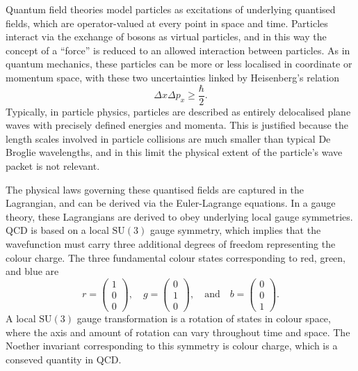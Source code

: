 \documentclass[12pt,a4paper]{report}
\begin{document}
Quantum field theories model particles as excitations of underlying quantised fields, which are operator-valued at every point in space and time. Particles interact via the exchange of bosons as virtual particles, and in this way the concept of a ``force'' is reduced to an allowed interaction between particles. As in quantum mechanics, these particles can be more or less localised in coordinate or momentum space, with these two uncertainties linked by Heisenberg's relation
\begin{equation}
  \Delta x \Delta p_x \geq \frac{\hbar}{2}.
\end{equation}
Typically, in particle physics, particles are described as entirely delocalised plane waves with precisely defined energies and momenta. This is justified because the length scales involved in particle collisions are much smaller than typical De Broglie wavelengths, and in this limit the physical extent of the particle's wave packet is not relevant.

The physical laws governing these quantised fields are captured in the Lagrangian, and can be derived via the Euler-Lagrange equations. In a gauge theory, these Lagrangians are derived to obey underlying local gauge symmetries. QCD is based on a local $\text{SU}(3)$ gauge symmetry, which implies that the wavefunction must carry three additional degrees of freedom representing the colour charge. The three fundamental colour states corresponding to red, green, and blue are
\begin{equation}
  r = \begin{pmatrix}1\\0\\0\end{pmatrix}, \quad g = \begin{pmatrix}0\\1\\0\end{pmatrix}, \quad \text{and} \quad b = \begin{pmatrix}0\\0\\1\end{pmatrix}.
\end{equation}
A local $\text{SU}(3)$ gauge transformation is a rotation of states in colour space, where the axis and amount of rotation can vary throughout time and space. The Noether invariant corresponding to this symmetry is colour charge, which is a conseved quantity in QCD.
\end{document}
